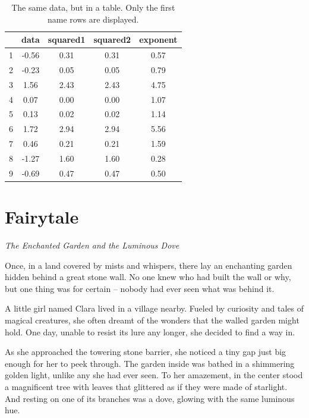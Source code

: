 \documentclass[10pt, a4paper, titlepage]{article}
\begin{document}
\begin{table}[htbp]
   \centering
    \caption{The same data, but in a table. Only the first name rows are displayed.}
    \begin{tabular}{@{}ccccc@{}}
         \toprule
         & \textbf{data}& \textbf{squared1} & \textbf{squared2} & \textbf{exponent} \\ \midrule
         1  & -0.56 & 0.31 & 0.31 & 0.57 \\
         2  & -0.23 & 0.05 & 0.05 & 0.79 \\
         3  & 1.56  & 2.43  & 2.43 & 4.75 \\
         4  & 0.07  & 0.00  & 0.00 & 1.07 \\
         5  & 0.13  & 0.02  & 0.02 & 1.14 \\
         6  & 1.72  & 2.94  & 2.94 & 5.56 \\
         7  & 0.46  & 0.21  & 0.21 & 1.59 \\
         8  & -1.27 & 1.60 & 1.60 & 0.28 \\
         9  & -0.69 & 0.47 & 0.47 & 0.50 \\ \bottomrule
    \end{tabular}  
\end{table}

\newpage
\section{Fairytale}

\textit{The Enchanted Garden and the Luminous Dove}

Once, in a land covered by mists and whispers, there lay an enchanting garden hidden behind a great stone wall. No one knew who had built the wall or why, but one thing was for certain – nobody had ever seen what was behind it.

A little girl named Clara lived in a village nearby. Fueled by curiosity and tales of magical creatures, she often dreamt of the wonders that the walled garden might hold. One day, unable to resist its lure any longer, she decided to find a way in.

As she approached the towering stone barrier, she noticed a tiny gap just big enough for her to peek through. The garden inside was bathed in a shimmering golden light, unlike any she had ever seen. To her amazement, in the center stood a magnificent tree with leaves that glittered as if they were made of starlight. And resting on one of its branches was a dove, glowing with the same luminous hue.
\end{document}
